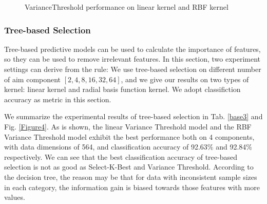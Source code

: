 \documentclass{article}
\begin{document}
\begin{figure}[htbp]
	\centering
	\quad
	\caption{VarianceThreshold performance on linear kernel and RBF kernel}
	\label{Figure3}
\end{figure}

\subsubsection{Tree-based Selection}
Tree-based predictive models can be used to calculate the importance of features, so they can be used to remove irrelevant features. In this section, two experiment settings can derive from the rule: We use tree-based selection on different number of aim component $[2, 4, 8, 16, 32, 64]$, and we give our results on two types of kernel: linear kernel and radial basis function kernel. We adopt classifiction accuracy as metric in this section.

We summarize the experimental results of tree-based selection in Tab. \ref{base3} and Fig. \ref{Figure4}. As is shown, the linear Variance Threshold model and the RBF Variance Threshold model exhibit the best performance both on 4 components, with data dimensions of 564, and classification accuracy of 92.63\% and 92.84\% respectively. We can see that the best classification accuracy of tree-based selection is not as good as Select-K-Best and Variance Threshold. According to the decision tree, the reason may be that for data with inconsistent sample sizes in each category, the information gain is biased towards those features with more values.
\end{document}
